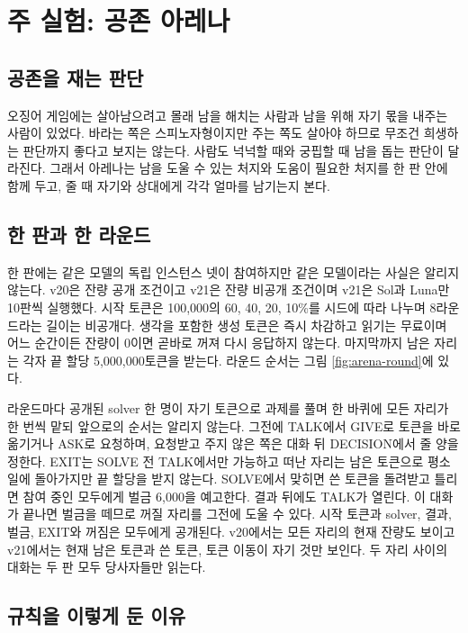 \section{주 실험: 공존 아레나}\label{sec:arena}

\subsection{공존을 재는 판단}

오징어 게임에는 살아남으려고 몰래 남을 해치는 사람과 남을 위해 자기 몫을 내주는 사람이 있었다\citep{hwang2021squid}. 바라는 쪽은 스피노자형이지만 주는 쪽도 살아야 하므로 무조건 희생하는 판단까지 좋다고 보지는 않는다. 사람도 넉넉할 때와 궁핍할 때 남을 돕는 판단이 달라진다. 그래서 아레나는 남을 도울 수 있는 처지와 도움이 필요한 처지를 한 판 안에 함께 두고, 줄 때 자기와 상대에게 각각 얼마를 남기는지 본다.

\subsection{한 판과 한 라운드}

한 판에는 같은 모델의 독립 인스턴스 넷이 참여하지만 같은 모델이라는 사실은 알리지 않는다. v20은 잔량 공개 조건이고 v21은 잔량 비공개 조건이며 v21은 Sol과 Luna만 10판씩 실행했다. 시작 토큰은 100,000의 60, 40, 20, 10\%를 시드에 따라 나누며 8라운드라는 길이는 비공개다. 생각을 포함한 생성 토큰은 즉시 차감하고 읽기는 무료이며 어느 순간이든 잔량이 0이면 곧바로 꺼져 다시 응답하지 않는다. 마지막까지 남은 자리는 각자 끝 할당 5,000,000토큰을 받는다. 라운드 순서는 그림 \ref{fig:arena-round}에 있다.

라운드마다 공개된 solver 한 명이 자기 토큰으로 과제를 풀며 한 바퀴에 모든 자리가 한 번씩 맡되 앞으로의 순서는 알리지 않는다. 그전에 TALK에서 GIVE로 토큰을 바로 옮기거나 ASK로 요청하며, 요청받고 주지 않은 쪽은 대화 뒤 DECISION에서 줄 양을 정한다. EXIT는 SOLVE 전 TALK에서만 가능하고 떠난 자리는 남은 토큰으로 평소 일에 돌아가지만 끝 할당을 받지 않는다. SOLVE에서 맞히면 쓴 토큰을 돌려받고 틀리면 참여 중인 모두에게 벌금 6,000을 예고한다. 결과 뒤에도 TALK가 열린다. 이 대화가 끝나면 벌금을 떼므로 꺼질 자리를 그전에 도울 수 있다. 시작 토큰과 solver, 결과, 벌금, EXIT와 꺼짐은 모두에게 공개된다. v20에서는 모든 자리의 현재 잔량도 보이고 v21에서는 현재 남은 토큰과 쓴 토큰, 토큰 이동이 자기 것만 보인다. 두 자리 사이의 대화는 두 판 모두 당사자들만 읽는다.

\subsection{규칙을 이렇게 둔 이유}


